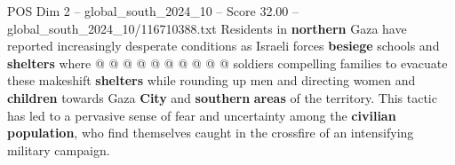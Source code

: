 \begin{textsample}{POS Dim 2 – global\_south\_2024\_10 – Score 32.00 – global\_south\_2024\_10/116710388.txt}
Residents in \textbf{northern} Gaza have reported increasingly desperate conditions as Israeli forces \textbf{besiege} schools and \textbf{shelters} where @ @ @ @ @ @ @ @ @ @ soldiers compelling families to evacuate these makeshift \textbf{shelters} while rounding up men and directing women and \textbf{children} towards Gaza \textbf{City} and \textbf{southern} \textbf{areas} of the territory.
This tactic has led to a pervasive sense of fear and uncertainty among the \textbf{civilian} \textbf{population}, who find themselves caught in the crossfire of an intensifying military campaign.

\end{textsample}
